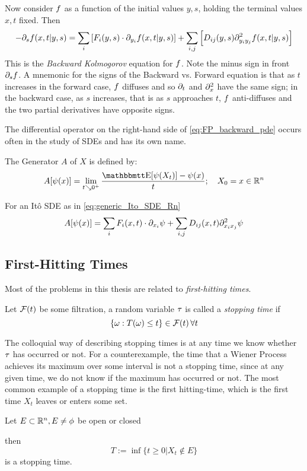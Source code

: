 Now consider ${f}$ as a function of the initial values $y,s$, holding the
terminal values $x,t$ fixed. Then
\begin{equation}
-{\partial}_s {f}(x,t|y,s)= \sum_i  \left[F_i(y,s) \cdot {\partial}_{y_i}{f}(x,t|y,s) \right] 
+ \sum_{i,j}   \left[ D_{ij}(y,s) {\partial}^2_{y_i y_j}{f}(x,t|y,s) \right]
\label{eq:FP_backward_pde}
\end{equation} 
This is the \emph{Backward Kolmogorov} equation for ${f}$. Note the minus sign
in front ${\partial}_s {f}$. A mnemonic for the signs of the Backward vs. Forward
equation is that as $t$ increases in the forward case, ${f}$ diffuses and so ${\partial}_t$ and ${\partial}^2_{x}$
have the same sign; in the backward case, as $s$ increases, that is as $s$ approaches $t$, ${f}$
anti-diffuses and the two partial derivatives have opposite signs. 
  
The differential operator on the right-hand side of
\cref{eq:FP_backward_pde} occurs often in the study of SDEs and has its own
name.
\begin{defn} The Generator $A$ of $X$ is defined by:
$$
A[\psi(x)] = \lim_{t \searrow 0^+} \frac{\Exp[\psi(X_t)]  - \psi(x)}{t} ;  \quad X_0 =
x \in \R^n
$$
\end{defn} 
\begin{lemma} For an It\^o SDE as in \cref{eq:generic_Ito_SDE_Rn} 
$$
A[\psi(x)] = \sum_i F_i(x,t) \cdot {\partial}_{x_i} \psi + \sum_{i,j} D_{ij}(x,t)
{\partial}^2_{x_i x_j}\psi $$
\end{lemma}


\subsection{First-Hitting Times}
Most of the problems in this thesis are related to {\sl first-hitting times}.

\begin{defn}
Let ${\mathcal{F}}(t)$ be some filtration, a random variable ${\tau}$ is called a
\emph{stopping time} if 
$$
\{{\omega} : T({\omega}) \leq t\} \in {\mathcal{F}}(t) \, \forall t  
$$
\end{defn}
The colloquial way of describing stopping times is at any time we know
whether ${\tau}$ has occurred or not. For a counterexample, the time that a Wiener
Process achieves its maximum over some interval is not a stopping time, since at any
given time, we do not know if the maximum has occurred or not. The most common
example of a stopping time is the first hitting-time, which is the first time
$X_t$ leaves or enters some set. 
\begin{thm} Let $E \subset { \mathbb{R} }^n, E \neq
\phi$ be open or closed
 
then $$T := \inf\{ t \geq 0 | X_t \notin E\}$$ is a stopping time.
\end{thm}
 
